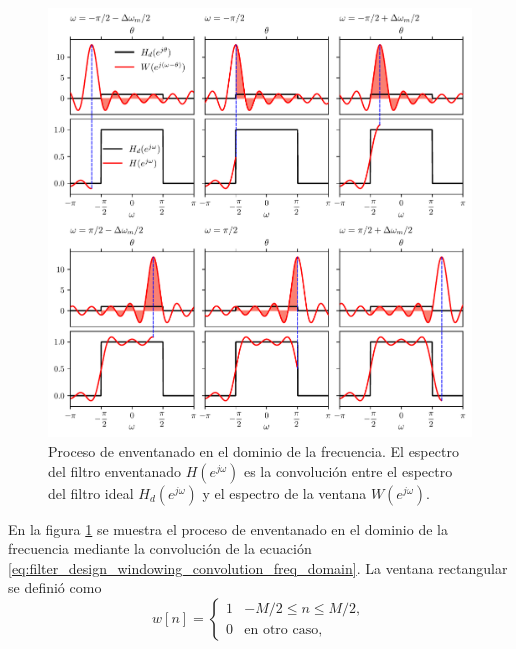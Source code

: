 \documentclass[a4paper]{report}
\begin{document}
\begin{figure}[!htb]
 \begin{center}
 \includegraphics[width=1\textwidth]{figuras/filter_design_windowing_convolution_ripple.pdf}
 \caption{\label{fig:filter_design_windowing_convolution_ripple} Proceso de enventanado en el dominio de la frecuencia. El espectro del filtro enventanado \(H(e^{j\omega})\) es la convolución entre el espectro del filtro ideal \(H_d(e^{j\omega})\) y el espectro de la ventana \(W(e^{j\omega})\).}
 \end{center}
\end{figure}
En la figura \ref{fig:filter_design_windowing_convolution_ripple} se muestra el proceso de enventanado en el dominio de la frecuencia mediante la convolución de la ecuación \ref{eq:filter_design_windowing_convolution_freq_domain}. La ventana rectangular se definió como
\[
  w[n]=\left\{ 
 \begin{array}{ll}
  1 & -M/2\leq n\leq M/2,\\ 
  0 & \textrm{en otro caso,}
 \end{array}
 \right. 
\]
\end{document}
